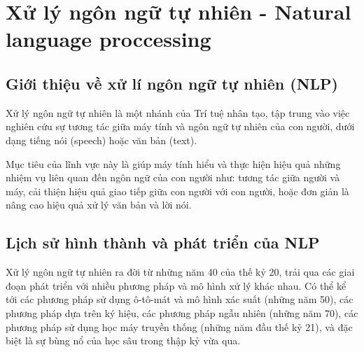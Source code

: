 
\chapter{Xử lý ngôn ngữ tự nhiên - Natural language proccessing} %

\label{Chapter1} %


\newcommand{\keyword}[1]{\textbf{#1}}
\newcommand{\tabhead}[1]{\textbf{#1}}
\newcommand{\code}[1]{\texttt{#1}}
\newcommand{\file}[1]{\texttt{\bfseries#1}}
\newcommand{\option}[1]{\texttt{\itshape#1}}


\section{Giới thiệu về xử lí ngôn ngữ tự nhiên (NLP)}

Xử lý ngôn ngữ tự nhiên là một nhánh của Trí tuệ nhân tạo, tập trung vào việc nghiên cứu sự tương tác giữa máy tính và ngôn ngữ tự nhiên của con người, dưới dạng tiếng nói (speech) hoặc văn bản (text)\cite{WEBSITE:1}.

Mục tiêu của lĩnh vực này là giúp máy tính hiểu và thực hiện hiệu quả những nhiệm vụ liên quan đến ngôn ngữ của con người như: tương tác giữa người và máy, cải thiện hiệu quả giao tiếp giữa con người với con người, hoặc đơn giản là nâng cao hiệu quả xử lý văn bản và lời nói.




\section{Lịch sử hình thành và phát triển của NLP}

Xử lý ngôn ngữ tự nhiên ra đời từ những năm 40 của thế kỷ 20, trải qua các giai đoạn phát triển với nhiều phương pháp và mô hình xử lý khác nhau. Có thể kể tới các phương pháp sử dụng ô-tô-mát và mô hình xác suất (những năm 50), các phương pháp dựa trên ký hiệu, các phương pháp ngẫu nhiên (những năm 70), các phương pháp sử dụng học máy truyền thống (những năm đầu thế kỷ 21), và đặc biệt là sự bùng nổ của học sâu trong thập kỷ vừa qua\cite{WEBSITE:1}.

